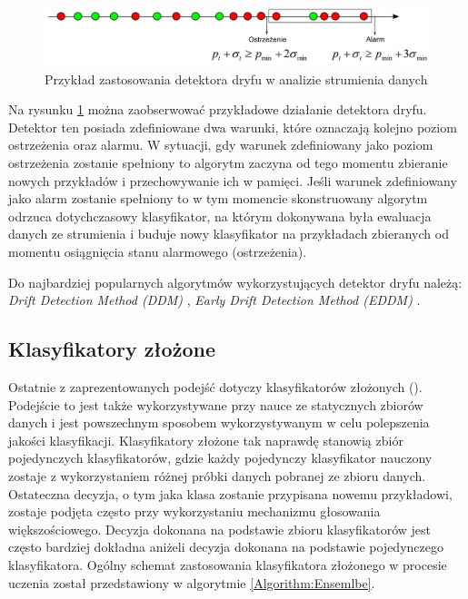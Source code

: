 \begin{figure}[h] 
    \centering
    \includegraphics[width=15cm]{figures/drift_detection.JPG}
    \caption{Przykład zastosowania detektora dryfu w analizie strumienia danych \cite{Prezentacja:Strumienie}}\label{Figure:DriftDetection}
\end{figure}

\noindent Na rysunku \ref{Figure:DriftDetection} można zaobserwować przykładowe działanie detektora dryfu. Detektor ten posiada zdefiniowane dwa warunki, które oznaczają kolejno poziom ostrzeżenia oraz alarmu. W sytuacji, gdy warunek zdefiniowany jako poziom ostrzeżenia zostanie spełniony to algorytm zaczyna od tego momentu zbieranie nowych przykładów i przechowywanie ich w pamięci. Jeśli warunek zdefiniowany jako alarm zostanie spełniony to w tym momencie skonstruowany algorytm odrzuca dotychczasowy klasyfikator, na którym dokonywana była ewaluacja danych ze strumienia i buduje nowy klasyfikator na przykładach zbieranych od momentu osiągnięcia stanu alarmowego (ostrzeżenia).

Do najbardziej popularnych algorytmów wykorzystujących detektor dryfu należą: \textit{Drift Detection Method (DDM)} \cite{Article:DriftDetection}, \textit{Early Drift Detection Method (EDDM)} \cite{Article:DriftDetection2}.

\subsection{Klasyfikatory złożone}

\noindent Ostatnie z zaprezentowanych podejść dotyczy klasyfikatorów złożonych (). Podejście to jest także wykorzystywane przy nauce ze statycznych zbiorów danych i jest powszechnym sposobem wykorzystywanym w celu polepszenia jakości klasyfikacji. Klasyfikatory złożone tak naprawdę stanowią zbiór pojedynczych klasyfikatorów, gdzie każdy pojedynczy klasyfikator nauczony zostaje z wykorzystaniem różnej próbki danych pobranej ze zbioru danych. Ostateczna decyzja, o tym jaka klasa zostanie przypisana nowemu przykładowi, zostaje podjęta często przy wykorzystaniu mechanizmu głosowania większościowego. Decyzja dokonana na podstawie zbioru klasyfikatorów jest często bardziej dokładna aniżeli decyzja dokonana na podstawie pojedynczego klasyfikatora. Ogólny schemat zastosowania klasyfikatora złożonego w procesie uczenia został przedstawiony w algorytmie \ref{Algorithm:Ensemlbe}.

